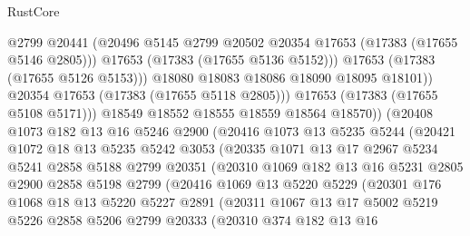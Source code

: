 \begin{lexlean}{RustCore}
\begin{coremodule}
                          @2799
                          @20441
                          (@20496 @5145 @2799 @20502 @20354 @17653 (@17383 (@17655 @5146 @2805)))
                          @17653
                          (@17383 (@17655 @5136 @5152)))
                        @17653
                        (@17383 (@17655 @5126 @5153)))
                      @18080
                      @18083
                      @18086
                      @18090
                      @18095
                      @18101))
                  @20354
                  @17653
                  (@17383 (@17655 @5118 @2805)))
                @17653
                (@17383 (@17655 @5108 @5171)))
              @18549
              @18552
              @18555
              @18559
              @18564
              @18570))
          (@20408
            @1073
            @182
            @13
            @16
            @5246
            @2900
            (@20416
              @1073
              @13
              @5235
              @5244
              (@20421
                @1072
                @18
                @13
                @5235
                @5242
                @3053
                (@20335
                  @1071
                  @13
                  @17
                  @2967
                  @5234
                  @5241
                  @2858
                  @5188
                  @2799
                  @20351
                  (@20310
                    @1069
                    @182
                    @13
                    @16
                    @5231
                    @2805
                    @2900
                    @2858
                    @5198
                    @2799
                    (@20416
                      @1069
                      @13
                      @5220
                      @5229
                      (@20301
                        @176
                        @1068
                        @18
                        @13
                        @5220
                        @5227
                        @2891
                        (@20311
                          @1067
                          @13
                          @17
                          @5002
                          @5219
                          @5226
                          @2858
                          @5206
                          @2799
                          @20333
                          (@20310
                            @374
                            @182
                            @13
                            @16

\end{coremodule}
\end{lexlean}
